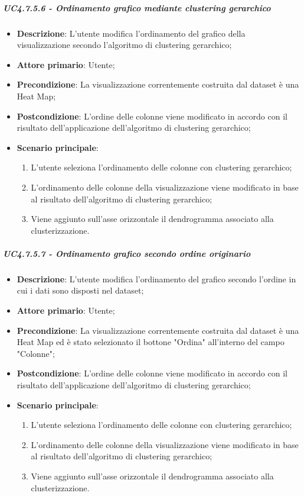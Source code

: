 \subparagraph{UC4.7.5.6 - Ordinamento grafico mediante clustering gerarchico}
\label{spar:uc4.7.5.6}
\begin{itemize}
    \item \textbf{Descrizione}:     L'utente modifica l'ordinamento del grafico  della visualizzazione secondo l'algoritmo di clustering gerarchico;
    \item \textbf{Attore primario}: Utente;
    \item \textbf{Precondizione}:   La visualizzazione correntemente costruita dal dataset è una Heat Map;
    \item \textbf{Postcondizione}:  L'ordine delle colonne viene modificato in accordo con il risultato dell'applicazione dell'algoritmo di clustering gerarchico;
    \item \textbf{Scenario principale}:
    \begin{enumerate}
        \item L'utente seleziona l'ordinamento delle colonne con clustering gerarchico;
        \item L'ordinamento delle colonne della visualizzazione viene modificato in base al risultato dell'algoritmo di clustering gerarchico;
        \item Viene aggiunto sull'asse orizzontale il dendrogramma associato alla clusterizzazione.
    \end{enumerate}
\end{itemize}

\subparagraph{UC4.7.5.7 - Ordinamento grafico secondo ordine originario }
\label{spar:uc4.7.5.7}
\begin{itemize}
    \item \textbf{Descrizione}:     L'utente modifica l'ordinamento del grafico secondo l'ordine in cui i dati sono disposti nel dataset;
    \item \textbf{Attore primario}: Utente;
    \item \textbf{Precondizione}:   La visualizzazione correntemente costruita dal dataset è una Heat Map ed è stato selezionato il bottone "Ordina" all'interno del campo "Colonne";
    \item \textbf{Postcondizione}:  L'ordine delle colonne viene modificato in accordo con il risultato dell'applicazione dell'algoritmo di clustering gerarchico;
    \item \textbf{Scenario principale}:
    \begin{enumerate}
        \item L'utente seleziona l'ordinamento delle colonne con clustering gerarchico;
        \item L'ordinamento delle colonne della visualizzazione viene modificato in base al risultato dell'algoritmo di clustering gerarchico;
        \item Viene aggiunto sull'asse orizzontale il dendrogramma associato alla clusterizzazione.
    \end{enumerate}
\end{itemize}



